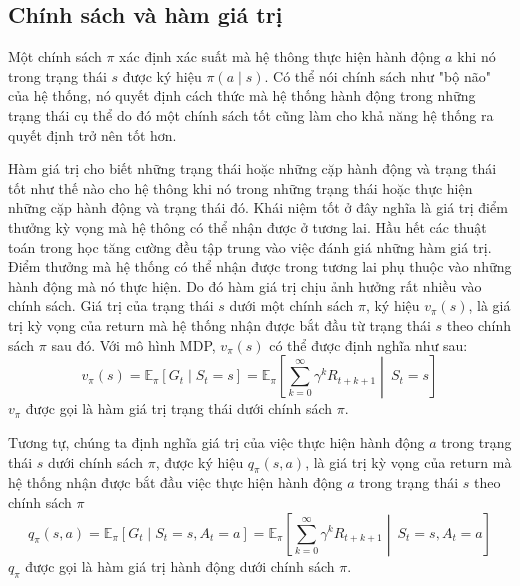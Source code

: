 	
	\subsection{Chính sách và hàm giá trị}
	Một chính sách $\pi$ xác định xác suất mà hệ thông thực hiện hành động $a$ khi nó trong trạng thái $s$ được ký hiệu $\pi(a \mid s)$. Có thể nói chính sách như "bộ não" của hệ thống, nó quyết định cách thức mà hệ thống hành động trong những trạng thái cụ thể do đó một chính sách tốt cũng làm cho khả năng hệ thống ra quyết định trở nên tốt hơn.
		
	Hàm giá trị cho biết những trạng thái hoặc những cặp hành động và trạng thái tốt như thế nào cho hệ thông khi nó trong những trạng thái hoặc thực hiện những cặp hành động và trạng thái đó. Khái niệm tốt ở đây nghĩa là giá trị điểm thưởng kỳ vọng mà hệ thông có thể nhận được ở tương lai. Hầu hết các thuật toán trong học tăng cường đều tập trung vào việc đánh giá những hàm giá trị. Điểm thưởng mà hệ thống có thể nhận được trong tương lai phụ thuộc vào những hành động mà nó thực hiện. Do đó hàm giá trị chịu ảnh hưởng rất nhiều vào chính sách. Giá trị của trạng thái $s$ dưới một chính sách $\pi$, ký hiệu $v_{\pi}(s)$, là giá trị kỳ vọng của return mà hệ thống nhận được bắt đầu từ trạng thái $s$ theo chính sách $\pi$ sau đó. Với mô hình MDP, $v_{\pi}(s)$ có thể được định nghĩa như sau:
	\begin{equation}
	v_{\pi}(s) = \mathbb{E}_{\pi}\left [\mathit{G}_t \mid \mathit{S}_{t} = s\right ] = \mathbb{E}_{\pi}\left [\sum_{k = 0}^{\infty}\gamma^{k}\mathit{R}_{t+k+1} \middle|\ \mathit{S}_t= s\right ]
	\end{equation}
	$v_{\pi}$ được gọi là hàm giá trị trạng thái dưới chính sách $\pi$.
	
	Tương tự, chúng ta định nghĩa giá trị của việc thực hiện hành động $a$ trong trạng thái $s$ dưới chính sách $\pi$, được ký hiệu $q_{\pi}(s,a)$, là giá trị kỳ vọng của return mà hệ thống nhận được bắt đầu việc thực hiện hành động $a$ trong trạng thái $s$ theo chính sách $\pi$
	\begin{equation}
	\label{action_value}
	q_{\pi}(s,a) = \mathbb{E}_{\pi}\left [\mathit{G}_t \mid \mathit{S}_{t} = s, \mathit{A}_{t} = a  \right ] = \mathbb{E}_{\pi}\left [\sum_{k = 0}^{\infty}\gamma^{k}\mathit{R}_{t+k+1} \middle|\ \mathit{S}_t= s, \mathit{A}_{t} = a \right ]
	\end{equation}
	$q_{\pi}$ được gọi là hàm giá trị hành động dưới chính sách $\pi$.
	
